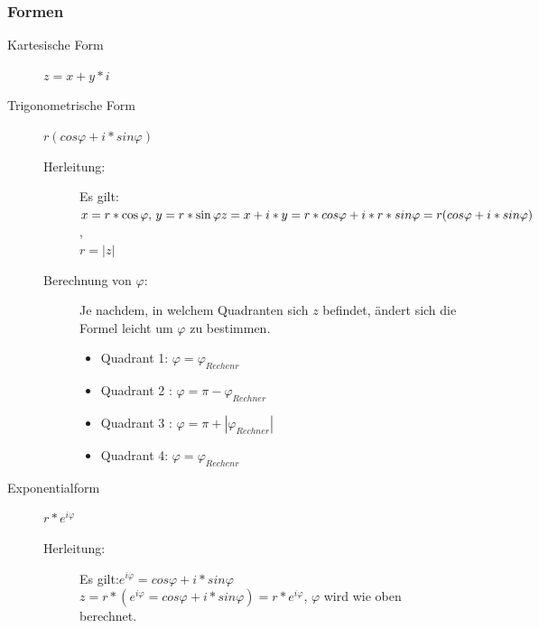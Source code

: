 \documentclass[a4paper]{scrartcl}
\begin{document}
            \subsubsection{Formen}    
                \begin{description}
                    \item[Kartesische Form] $z = x + y*i$
                    \item[Trigonometrische Form]   $r(cos\varphi + i*sin\varphi)$
                    \begin{description}
                        \item[Herleitung:]  Es gilt: \(x = r * \cos\varphi, \, y = r * \sin\varphi \\
                        z = x + i*y = r * cos\varphi + i * r* sin\varphi = r(cos\varphi + i*sin\varphi) \), 
                        \\ $r = |z|$ 
                        \item[Berechnung von $\varphi$:] Je nachdem, in welchem Quadranten sich $z$ befindet, ändert sich die Formel leicht um $\varphi$ zu bestimmen.
                        \begin{itemize}
                            \item Quadrant 1: $\varphi = \varphi_{Rechenr}$
                            \item Quadrant 2 : $\varphi = \pi - \varphi_{Rechner}$
                            \item Quadrant 3 : $\varphi = \pi + |\varphi_{Rechner}|$
                            \item Quadrant 4: $\varphi = \varphi_{Rechenr}$
                        \end{itemize}
                    \end{description}
                    \newpage
                    \item[Exponentialform] $r * e^{i\varphi}$ 
                    \begin{description}
                        \item[Herleitung:] Es gilt:\(e^{i\varphi} = cos\varphi + i * sin\varphi \) \\ \(z = r * (e^{i\varphi} = cos\varphi + i * sin\varphi) = r * e^{i\varphi} \), $\varphi$ wird wie oben berechnet.
                    \end{description}
                \end{description}          
\end{document}
